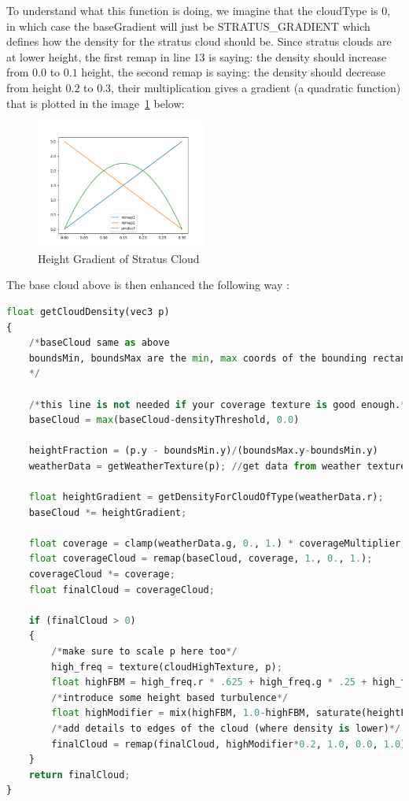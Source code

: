 To understand what this function is doing, we imagine that the cloudType is $0$, in which case the baseGradient will just be STRATUS\_GRADIENT which defines how the density for the stratus cloud should be. Since stratus clouds are at lower height, the first remap in line $13$ is saying: the density should increase from $0.0$ to $0.1$ height, the second remap is saying: the density should decrease from height $0.2$ to $0.3$, their multiplication gives a gradient (a quadratic function) that is plotted in the image~\ref{fig:stratus_grad} below:
\begin{figure}[H]
    \centering
    \includegraphics[width=0.5\textwidth]{images/stratus_grad.png}
    \caption{Height Gradient of Stratus Cloud}
    \label{fig:stratus_grad}
\end{figure}

The base cloud above is then enhanced the following way \cite{engel2016gpupro7} \cite{gamedevnet2015horizonzerodawn}:
\begin{lstlisting}[language=Python]
float getCloudDensity(vec3 p)
{
    /*baseCloud same as above
    boundsMin, boundsMax are the min, max coords of the bounding rectangle (AABB)
    */

    /*this line is not needed if your coverage texture is good enough.*/
    baseCloud = max(baseCloud-densityThreshold, 0.0)

    heightFraction = (p.y - boundsMin.y)/(boundsMax.y-boundsMin.y)
    weatherData = getWeatherTexture(p); //get data from weather texture

    float heightGradient = getDensityForCloudOfType(weatherData.r);
    baseCloud *= heightGradient;

    float coverage = clamp(weatherData.g, 0., 1.) * coverageMultiplier;
    float coverageCloud = remap(baseCloud, coverage, 1., 0., 1.);
    coverageCloud *= coverage;
    float finalCloud = coverageCloud;

    if (finalCloud > 0)
    {
        /*make sure to scale p here too*/
        high_freq = texture(cloudHighTexture, p);
        float highFBM = high_freq.r * .625 + high_freq.g * .25 + high_freq.b * .125;
        /*introduce some height based turbulence*/
        float highModifier = mix(highFBM, 1.0-highFBM, saturate(heightFraction * 10.0));
        /*add details to edges of the cloud (where density is lower)*/
        finalCloud = remap(finalCloud, highModifier*0.2, 1.0, 0.0, 1.0);
    }
    return finalCloud;
}
\end{lstlisting}

